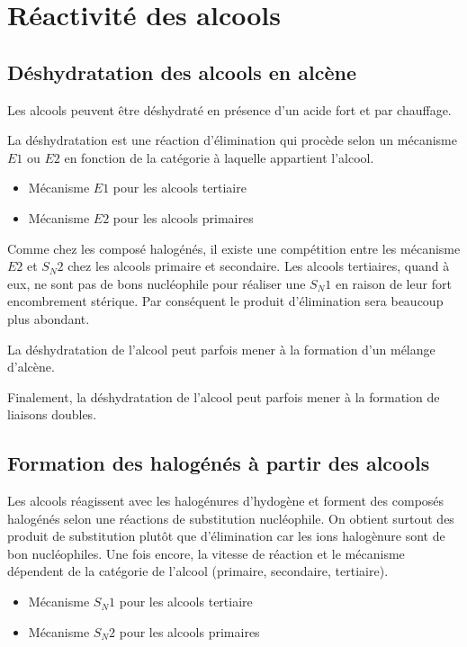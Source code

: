 \section{Réactivité des alcools}

\subsection{Déshydratation des alcools en alcène}
Les alcools peuvent être déshydraté en présence d'un acide fort et par chauffage.

La déshydratation est une réaction d'élimination qui procède selon un mécanisme $E1$ ou $E2$ en fonction de la catégorie à laquelle appartient l'alcool.

\begin{itemize}
  \item Mécanisme $E1$ pour les alcools tertiaire
  \item Mécanisme $E2$ pour les alcools primaires
\end{itemize}

Comme chez les composé halogénés, il existe une compétition entre les mécanisme $E2$ et $S_N2$ chez les alcools primaire et secondaire.
Les alcools tertiaires, quand à eux, ne sont pas de bons nucléophile pour réaliser une $S_N1$ en raison de leur fort encombrement stérique.
Par conséquent le produit d'élimination sera beaucoup plus abondant.

La déshydratation de l'alcool peut parfois mener à la formation d'un mélange d'alcène.

Finalement, la déshydratation de l'alcool peut parfois mener à la formation de liaisons doubles.

\subsection{Formation des halogénés à partir des alcools}
Les alcools réagissent avec les halogénures d'hydogène et forment des composés halogénés selon une réactions de substitution nucléophile.
On obtient surtout des produit de substitution plutôt que d'élimination car les ions halogènure sont de bon nucléophiles.
Une fois encore, la vitesse de réaction et le mécanisme dépendent de la catégorie de l'alcool (primaire, secondaire, tertiaire).

\begin{itemize}
  \item Mécanisme $S_N1$ pour les alcools tertiaire
  \item Mécanisme $S_N2$ pour les alcools primaires
\end{itemize}

